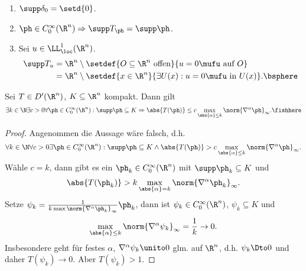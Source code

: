 \begin{bsp}
\label{bsp:3.25}
\begin{enumerate}[label=\arabic{*}.)]
  \item $\supp \delta_0 = \setd{0}$.
  \item $\ph\in C_0^\infty(\R^n) \Rightarrow \supp T_\ph = \supp\ph$.
  \item Sei $u\in\LL_\loc^1(\R^n)$.
  \begin{align*}
  \supp T_u &=
  \R^n\setminus\setdef{O\subseteq\R^n\text{ offen}}{u=0\mufu \text{ auf } O} \\
  &= \R^n\setminus\setdef{x\in\R^n}{\exists U(x)  : u=0\mufu \text{ in }
  U(x)}.\bsphere
  \end{align*}
\end{enumerate}
\end{bsp}

\begin{prop}
\label{prop:3.26}
Sei $T\in D'(\R^n)$, $K\subseteq\R^n$ kompakt. Dann gilt
\begin{align*}
\exists k\in\N \exists c > 0 \forall\ph\in C_0^\infty(\R^n) : \supp
\ph\subseteq K\Rightarrow \abs{T(\ph)} \le c \max\limits_{\abs{\alpha}\le k}
\norm{\nabla^\alpha\ph}_\infty.\fishhere
\end{align*}
\end{prop}
\begin{proof}
Angenommen die Aussage wäre falsch, d.h.
\begin{align*}
\forall k\in\N \forall c > 0 \exists \ph\in C_0^\infty(\R^n) : \supp\ph
\subseteq K \land \abs{T(\ph)} > c\max\limits_{\abs{\alpha}\le k}
\norm{\nabla^\alpha \ph}_\infty.
\end{align*}
Wähle $c=k$, dann gibt es ein $\ph_k\in C_0^\infty(\R^n)$ mit
$\supp\ph_k\subseteq K$ und
\begin{align*}
\abs{T(\ph_k)} > k\max\limits_{\abs{\alpha}=k} \norm{\nabla^\alpha
\ph_k}_\infty.
\end{align*}
Setze $\psi_k = \frac{1}{k\max\norm{\nabla^\alpha \ph_k}_\infty}\ph_k$, dann
ist $\psi_k\in C_0^\infty(\R^n)$, $\psi_k\subseteq K$ und
\begin{align*}
\max\limits_{\abs{\alpha}\le k} \norm{\nabla^\alpha \psi_k}_\infty = \frac{1}{k}
\to 0.
\end{align*}
Insbesondere geht für festes $\alpha$, $\nabla^\alpha \psi_k \unito 0$ glm. auf
$\R^n$, d.h. $\psi_k \Dto 0$ und daher $T(\psi_k)\to 0$. Aber $T(\psi_k) >
1$.\dipper\qedhere
\end{proof}

